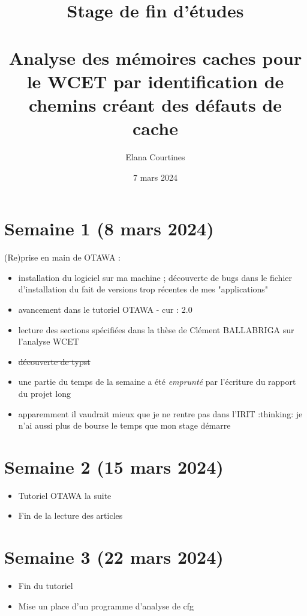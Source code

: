 \documentclass[a4paper,12pt]{article}
\title{Stage de fin d'études\\ \vspace*{20mm} \scalebox{2}{Rapport d'avancement}\\ \vspace*{20mm} Analyse des mémoires caches pour le WCET par identification de chemins créant des défauts de cache}
\author{Elana Courtines}
\date{7 mars 2024}
\begin{document}
\maketitle


\section{Semaine 1 (8 mars 2024)}

(Re)prise en main de OTAWA :

\begin{itemize}
  \item installation du logiciel sur ma machine ; découverte de bugs dans le fichier d'installation du fait de versions trop récentes de mes "applications"
  \item avancement dans le tutoriel OTAWA - cur : 2.0
  \item lecture des sections spécifiées dans la thèse de Clément BALLABRIGA sur l'analyse WCET
  \item \sout{découverte de typst}
  \item une partie du temps de la semaine a été \textit{emprunté} par l'écriture du rapport du projet long
  \item apparemment il vaudrait mieux que je ne rentre pas dans l'IRIT :thinking: je n'ai aussi plus de bourse le temps que mon stage démarre 
\end{itemize}


\section{Semaine 2 (15 mars 2024)}


\begin{itemize}
  \item Tutoriel OTAWA la suite
  \item Fin de la lecture des articles
\end{itemize}



\section{Semaine 3 (22 mars 2024)}

\begin{itemize}
  \item Fin du tutoriel
  \item Mise un place d'un programme d'analyse de cfg
\end{itemize}
\end{document}
